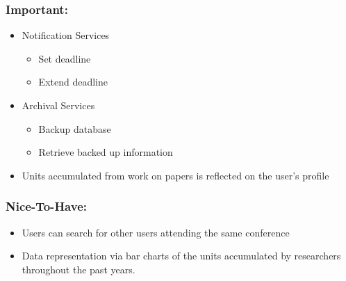 \documentclass[11pt]{article}
\begin{document}
	\subsubsection{Important:}
	\begin{itemize}
		\item Notification Services
		\begin{itemize}
			\item Set deadline
			\item Extend deadline
		\end{itemize}
		\item Archival Services
		\begin{itemize}
			\item Backup  database
			\item Retrieve backed up information
		\end{itemize}
	\end{itemize}
	\begin{itemize}
		\item Units accumulated from work on papers is reflected on the user's profile
	\end{itemize}
	
	\subsubsection{Nice-To-Have:}
	\begin{itemize}
		\item Users can search for other users attending the same conference
		\item Data representation via bar charts of the units accumulated by researchers throughout the past years.
	\end{itemize}
	
\end{document}
